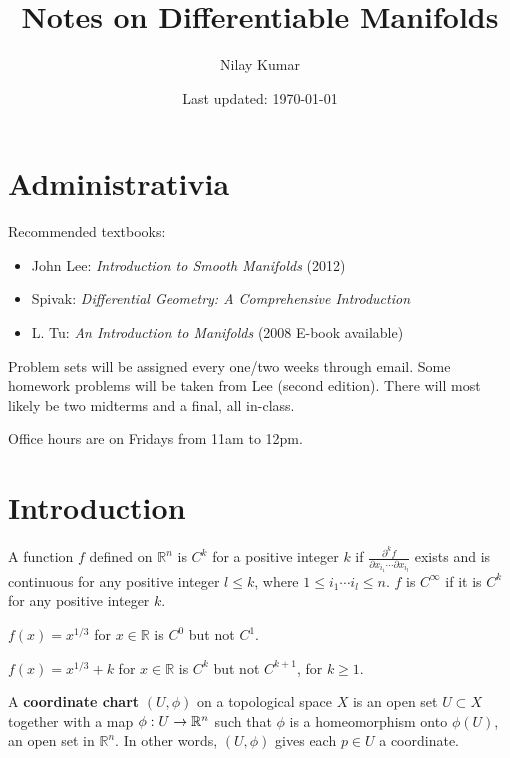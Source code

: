 \documentclass{../mathnotes}
\title{Notes on Differentiable Manifolds}
\author{Nilay Kumar}
\date{Last updated: \today}
\begin{document}
\maketitle

\setcounter{section}{-1}

\section{Administrativia}

Recommended textbooks:
\begin{itemize}
    \item John Lee: \textit{Introduction to Smooth Manifolds} (2012)
    \item Spivak: \textit{Differential Geometry: A Comprehensive Introduction}
    \item L. Tu: \textit{An Introduction to Manifolds} (2008 E-book available)
\end{itemize}

Problem sets will be assigned every one/two weeks through email. Some homework problems will be taken from Lee (second edition).
There will most likely be two midterms and a final, all in-class.

Office hours are on Fridays from 11am to 12pm.

\section{Introduction}

\begin{defn}
    A function $f$ defined on $\mathbb{R}^n$ is $C^k$ for a positive integer $k$ if $\frac{\partial^k f}{\partial x_{i_1}\cdots\partial x_{i_l}}$ 
    exists and is continuous for any positive integer $l\leq k$, where $1\leq i_1\cdots i_l\leq n$. $f$ is $C^\infty$ if it is $C^k$ for any positive
    integer $k$.
\end{defn}

\begin{exmp}
    $f(x)=x^{1/3}$ for $x\in\mathbb{R}$ is $C^0$ but not $C^1$.
\end{exmp}

\begin{exmp}
    $f(x)=x^{1/3}+k$ for $x\in\mathbb{R}$ is $C^k$ but not $C^{k+1}$, for $k\geq 1$.
\end{exmp}

\begin{defn}
    A \textbf{coordinate chart} $(U,\phi)$ on a topological space $X$ is an open set $U\subset X$ together with a map $\phi:U\rightarrow \mathbb{R}^n$
    such that $\phi$ is a homeomorphism onto $\phi(U)$, an open set in $\mathbb{R}^n$. In other words, $(U,\phi)$ gives each $p\in U$ a
    coordinate.
\end{defn}
\end{document}
